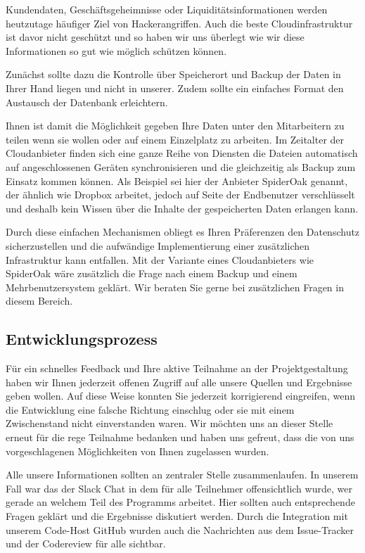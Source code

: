 \documentclass[12pt]{article}
\begin{document}
Kundendaten, Geschäftsgeheimnisse oder Liquiditätsinformationen werden heutzutage häufiger Ziel von Hackerangriffen. Auch die beste Cloudinfrastruktur ist davor nicht geschützt und so haben wir uns überlegt wie wir diese Informationen so gut wie möglich schützen können.
\newline

Zunächst sollte dazu die Kontrolle über Speicherort und Backup der Daten in Ihrer Hand liegen und nicht in unserer. Zudem sollte ein einfaches Format den Austausch der Datenbank erleichtern.
\newline

Ihnen ist damit die Möglichkeit gegeben Ihre Daten unter den Mitarbeitern zu teilen wenn sie wollen oder auf einem Einzelplatz zu arbeiten. Im Zeitalter der Cloudanbieter finden sich eine ganze Reihe von Diensten die Dateien automatisch auf angeschlossenen Geräten synchronisieren und die gleichzeitig als Backup zum Einsatz kommen können. Als Beispiel sei hier der Anbieter SpiderOak genannt, der ähnlich wie Dropbox arbeitet, jedoch auf Seite der Endbenutzer verschlüsselt und deshalb kein Wissen über die Inhalte der gespeicherten Daten erlangen kann.
\newline 

Durch diese einfachen Mechanismen obliegt es Ihren Präferenzen den Datenschutz sicherzustellen und die aufwändige Implementierung einer zusätzlichen Infrastruktur kann entfallen. Mit der Variante eines Cloudanbieters wie SpiderOak wäre zusätzlich die Frage nach einem Backup und einem Mehrbenutzersystem geklärt. Wir beraten Sie gerne bei zusätzlichen Fragen in diesem Bereich.

\subsection{Entwicklungsprozess}

Für ein schnelles Feedback und Ihre aktive Teilnahme an der Projektgestaltung haben wir Ihnen jederzeit offenen Zugriff auf alle unsere Quellen und Ergebnisse geben wollen. Auf diese Weise konnten Sie jederzeit korrigierend eingreifen, wenn die Entwicklung eine falsche Richtung einschlug oder sie mit einem Zwischenstand nicht einverstanden waren. Wir möchten uns an dieser Stelle erneut für die rege Teilnahme bedanken und haben uns gefreut, dass die von uns vorgeschlagenen Möglichkeiten von Ihnen zugelassen wurden. 
\newline

Alle unsere Informationen sollten an zentraler Stelle zusammenlaufen. In unserem Fall war das der Slack Chat in dem für alle Teilnehmer offensichtlich wurde, wer gerade an welchem Teil des Programms arbeitet. Hier sollten auch entsprechende Fragen geklärt und die Ergebnisse diskutiert werden. Durch die Integration mit unserem Code-Host GitHub wurden auch die Nachrichten aus dem Issue-Tracker und der Codereview für alle sichtbar.
\newline
\end{document}

